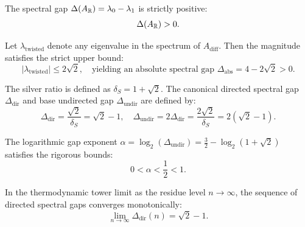 \begin{theorem}
\label{thm:schreier_spectral_gap_pos}
\leanok
The spectral gap $\Delta(A_{\mathbb{R}}) = \lambda_0 - \lambda_1$ is strictly positive:
\[
\Delta(A_{\mathbb{R}}) > 0.
\]
\end{theorem}

\begin{theorem}
\label{thm:absolute_spectral_gap}
\leanok
Let $\lambda_{\mathrm{twisted}}$ denote any eigenvalue in the spectrum of $A_{\mathrm{diff}}$. Then the magnitude satisfies the strict upper bound:
\[
|\lambda_{\mathrm{twisted}}| \le 2\sqrt{2}, \quad \text{yielding an absolute spectral gap } \Delta_{\mathrm{abs}} = 4 - 2\sqrt{2} > 0.
\]
\end{theorem}

\begin{definition}
\label{def:silver_ratio}
\leanok
The silver ratio is defined as $\delta_S = 1 + \sqrt{2}$. The canonical directed spectral gap $\Delta_{\mathrm{dir}}$ and base undirected gap $\Delta_{\mathrm{undir}}$ are defined by:
\[
\Delta_{\mathrm{dir}} = \frac{\sqrt{2}}{\delta_S} = \sqrt{2} - 1, \quad \Delta_{\mathrm{undir}} = 2 \Delta_{\mathrm{dir}} = \frac{2\sqrt{2}}{\delta_S} = 2(\sqrt{2} - 1).
\]
\end{definition}

\begin{theorem}
\label{thm:undirected_gap_exponent}
\leanok
The logarithmic gap exponent $\alpha = \log_2(\Delta_{\mathrm{undir}}) = \frac{3}{2} - \log_2(1 + \sqrt{2})$ satisfies the rigorous bounds:
\[
0 < \alpha < \frac{1}{2} < 1.
\]
\end{theorem}

\begin{theorem}
\label{thm:asymptotic_gap_limit}
\leanok
In the thermodynamic tower limit as the residue level $n \to \infty$, the sequence of directed spectral gaps converges monotonically:
\[
\lim_{n \to \infty} \Delta_{\mathrm{dir}}(n) = \sqrt{2} - 1.
\]
\end{theorem}

